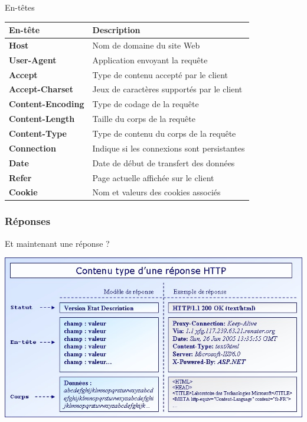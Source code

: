 \begin{frame}{En-têtes}

\begin{table}[h]
    \begin{tabular}{|l|p{}|}
\hline
   En-tête & Description\\ \hline \hline
   \textbf{Host} & Nom de domaine du site Web\\ \hline
   \textbf{User-Agent} & Application envoyant la requête\\ \hline
   \textbf{Accept} & Type de contenu accepté par le client\\ \hline
   \textbf{Accept-Charset} & Jeux de caractères supportés par le client\\ \hline
   \textbf{Content-Encoding} & Type de codage de la requête\\ \hline
   \textbf{Content-Length} & Taille du corps de la requête\\ \hline
   \textbf{Content-Type} & Type de contenu du corps de la requête\\ \hline
   \textbf{Connection} & Indique si les connexions sont persistantes\\ \hline
   \textbf{Date} & Date de début de transfert des données\\ \hline   
   \textbf{Refer} & Page actuelle affichée sur le client\\ \hline
   \textbf{Cookie} & Nom et valeurs des cookies associés\\ \hline
\end{tabular}
\end{table}

\end{frame}

\subsubsection{Réponses}

\begin{frame}{Et maintenant une réponse ?}
	
    \begin{center}
        \includegraphics[width=1\textwidth]{img_http/reponse.jpg}
    \end{center}

\end{frame}



